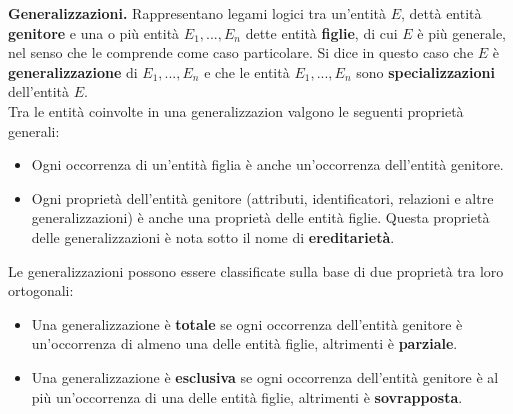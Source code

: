 \textbf{Generalizzazioni.} Rappresentano legami logici tra un'entità $E$, dettà entità \textbf{genitore} e una o più entità $E_1, ..., E_n$ dette entità \textbf{figlie}, di cui $E$ è più generale, nel senso che le comprende come caso particolare. Si dice in questo caso che $E$ è \textbf{generalizzazione} di $E_1, ..., E_n$ e che le entità $E_1, ..., E_n$ sono \textbf{specializzazioni} dell'entità $E$.\\
Tra le entità coinvolte in una generalizzazion valgono le seguenti proprietà generali:
    \begin{itemize}
        \item{Ogni occorrenza di un'entità figlia è anche un'occorrenza dell'entità genitore.}
        \item{Ogni proprietà dell'entità genitore (attributi, identificatori, relazioni e altre generalizzazioni) è anche una proprietà delle entità figlie. Questa proprietà delle generalizzazioni è nota sotto il nome di \textbf{ereditarietà}.}
    \end{itemize}
Le generalizzazioni possono essere classificate sulla base di due proprietà tra loro ortogonali:
    \begin{itemize}
        \item{Una generalizzazione è \textbf{totale} se ogni occorrenza dell'entità genitore è un'occorrenza di almeno una delle entità figlie, altrimenti è \textbf{parziale}.}
        \item{Una generalizzazione è \textbf{esclusiva} se ogni occorrenza dell'entità genitore è al più un'occorrenza di una delle entità figlie, altrimenti è \textbf{sovrapposta}.}
    \end{itemize}


